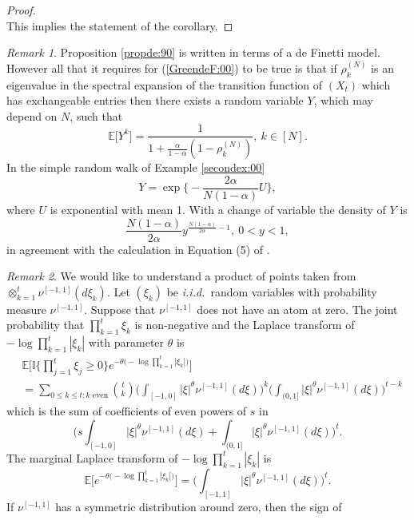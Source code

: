 \documentclass[preprint,11pt]{elsarticle}
\theoremstyle{remark}
\newtheorem{Remark}{Remark}
\def\spin{{[-1,1]}}
\def\iid{\emph{i.i.d.}~}
\begin{document}
{\begin{proof}
\[\]
This implies the statement of the corollary.
\end{proof}
\begin{Remark}\label{Y:000}
Proposition \ref{propde:90} is written in terms of a de Finetti model. However all that it requires for (\ref{GreendeF:00}) to be true is that if $\rho_k^{(N)}$ is an eigenvalue in the spectral expansion of the transition function of $(X_t)$ which has exchangeable entries then
there exists a random variable $Y$, which may depend on $N$, such that
\[
\mathbb{E}\big [Y^k\big ] 
= \frac{1}
{1 + \frac{\alpha}{1-\alpha}(1-\rho_k^{(N)})},\ k\in [N].
\]
In the simple random walk of Example \ref{secondex:00} 
\[
Y = \exp\Big \{-\frac{2\alpha}{N(1-\alpha)}U\Big \},
\]
where $U$ is exponential with mean 1. With a change of variable the density of $Y$ is
\[
{\scriptstyle\frac{N(1-\alpha)}{2\alpha}}y^{\frac{N(1-\alpha)}{2\alpha}-1},\ 0 < y < 1,
\]
in agreement with the calculation in Equation (5) of \cite{CG2025}.
\end{Remark}
\begin{Remark}\label{remarkmod:00}
We would like to understand a product of points taken from $\otimes_{k=1}^t\nu^\spin(d\xi_k)$.  Let $(\xi_k)$ be \iid  random variables with probability measure $\nu^\spin$. Suppose that $\nu^\spin$ does not have an atom at zero. The joint probability that $\prod_{k=1}^t\xi_k$ is non-negative and the Laplace transform of 
$-\log \prod_{k=1}^t|\xi_k|$ with parameter $\theta$ is
\begin{align}
&\mathbb{E}\Big [ \mathbb{I}\big \{\prod_{j=1}^t\xi_j \geq 0\big \}e^{-\theta \big (-\log \prod_{k=1}^t|\xi_k|\big )}\Big ]
\nonumber\\
&=\sum_{0\leq k \leq t: k\text{~even}}
{t\choose k}
\Big (\int_{[-1,0]}|\xi|^\theta\nu^\spin(d\xi)\Big )^k\Big (\int_{(0,1]}|\xi|^\theta\nu^\spin(d\xi) \Big )^{t-k}
\nonumber
\end{align}
which is the sum of coefficients of even powers of $s$ in
\begin{equation}
\Bigg (s\int_{[-1,0]}|\xi|^\theta\nu^\spin(d\xi)+ \int_{(0,1]}|\xi|^\theta\nu^\spin(d\xi)\Bigg )^t.
\label{modxx:00}
\end{equation}
 The marginal Laplace transform of $-\log \prod_{k=1}^t|\xi_k|$ is
\begin{equation}
\mathbb{E}\Big [e^{-\theta \big (-\log \prod_{k=1}^t|\xi_k|\big )}\Big ]
= \Bigg (\int_\spin|\xi|^\theta\nu^\spin(d\xi)\Bigg )^t.
\label{LT:74}
\end{equation}
If $\nu^\spin$ has a symmetric distribution around zero, then the sign of 

\end{Remark}}
\end{document}
